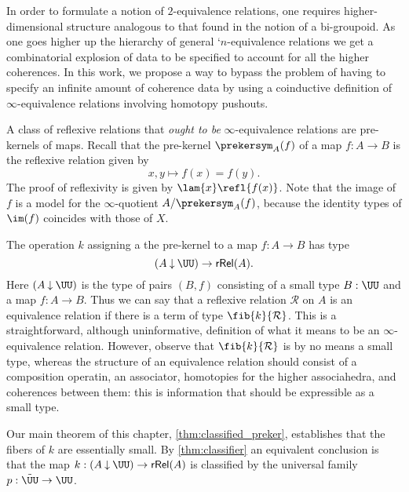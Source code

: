 In order to formulate a notion of $2$-equivalence relations, one requires higher-dimensional structure analogous to that found in the notion of a bi-groupoid. As one goes higher up the hierarchy of general `$n$-equivalence relations we get a combinatorial explosion of data to be specified to account for all the higher coherences. In this work, we propose a way to bypass the problem of having to specify an infinite amount of coherence data by using a coinductive definition of $\infty$-equivalence relations involving homotopy pushouts.

A class of reflexive relations that \emph{ought to be} $\infty$-equivalence relations are pre-kernels of maps. Recall that the pre-kernel $\prekersym_A(f)$ of a map $f:A\to B$ is the reflexive relation given by
\begin{equation*}
x,y\mapsto f(x)=f(y).
\end{equation*}
The proof of reflexivity is given by $\lam{x}\refl{f(x)}$.
Note that the image of $f$ is a model for the $\infty$-quotient $A/\prekersym_A(f)$, because the identity types of $\im(f)$ coincides with those of $X$.

The operation $k$ assigning a the pre-kernel to a map $f:A\to B$ has type
\begin{equation*}
(A\mathbin{\downarrow}\UU)\to\mathsf{rRel}(A).
\end{equation*}
Here $(A\mathbin{\downarrow}\UU)$ is the type of pairs $(B,f)$ consisting of a small type $B:\UU$ and a map $f:A\to B$.
Thus we can say that a reflexive relation $\mathcal{R}$ on $A$ is an equivalence relation if there is a term of type $\fib{k}{\mathcal{R}}$. This is a straightforward, although uninformative, definition of what it means to be an $\infty$-equivalence relation. However, observe that $\fib{k}{\mathcal{R}}$ is by no means a small type, whereas the structure of an equivalence relation should consist of a composition operatin, an associator, homotopies for the higher associahedra, and coherences between them: this is information that should be expressible as a small type.

Our main theorem of this chapter, \cref{thm:classified_preker}, establishes that the fibers of $k$ are essentially small. By \cref{thm:classifier} an equivalent conclusion is that the map $k:(A\mathbin{\downarrow}\UU)\to \mathsf{rRel}(A)$ is classified by the universal family $p:\tilde{\UU}\to\UU$. 

